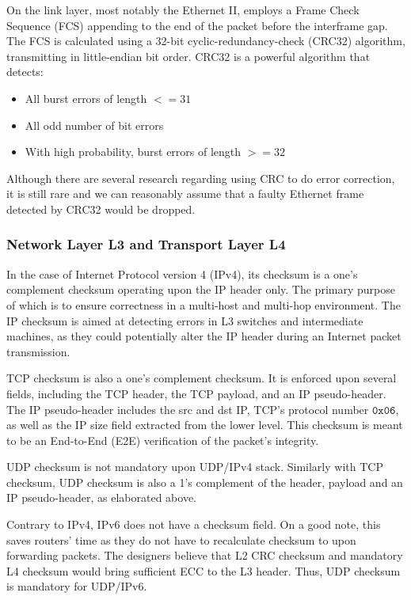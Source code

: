 \documentclass[12pt,letterpaper]{article}
\begin{document}
On the link layer, most notably the Ethernet II, employs a Frame Check Sequence (FCS) appending to the end of the packet before the interframe gap. The FCS is calculated using a 32-bit cyclic-redundancy-check (CRC32) algorithm, transmitting in little-endian bit order. CRC32 is a powerful algorithm that detects:
\begin{itemize}
    \item All burst errors of length $<= 31$
    \item All odd number of bit errors
    \item With high probability, burst errors of length $>= 32$
\end{itemize}

Although there are several research regarding using CRC to do error correction, it is still rare and we can reasonably assume that a faulty Ethernet frame detected by CRC32 would be dropped.

\subsubsection{Network Layer L3 and Transport Layer L4}

In the case of Internet Protocol version 4 (IPv4), its checksum is a one's complement checksum operating upon the IP header only. The primary purpose of which is to ensure correctness in a multi-host and multi-hop environment. The IP checksum is aimed at detecting errors in L3 switches and intermediate machines, as they could potentially alter the IP header during an Internet packet transmission.

TCP checksum is also a one's complement checksum. It is enforced upon several fields, including the TCP header, the TCP payload, and an IP pseudo-header. The IP pseudo-header includes the src and dst IP, TCP's protocol number $\mathtt{0x06}$, as well as the IP size field extracted from the lower level. This checksum is meant to be an End-to-End (E2E) verification of the packet's integrity.

UDP checksum is not mandatory upon UDP/IPv4 stack. Similarly with TCP checksum, UDP checksum is also a 1's complement of the header, payload and an IP pseudo-header, as elaborated above.

Contrary to IPv4, IPv6 does not have a checksum field. On a good note, this saves routers' time as they do not have to recalculate checksum to upon forwarding packets. The designers believe that L2 CRC checksum and mandatory L4 checksum would bring sufficient ECC to the L3 header. Thus, UDP checksum is mandatory for UDP/IPv6.
\end{document}
